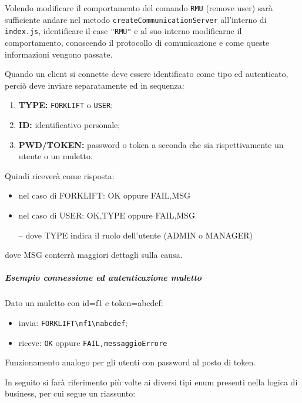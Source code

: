     Volendo modificare il comportamento del comando \texttt{RMU} (remove user) sarà sufficiente andare nel metodo \texttt{createCommunicationServer} all'interno di \texttt{index.js}, identificare il case \texttt{"RMU"} e al suo interno modificarne il comportamento, conoscendo il protocollo di comunicazione e come queste informazioni vengono passate.

    Quando un client si connette deve essere identificato come tipo ed autenticato, perciò deve inviare separatamente ed in sequenza:
    \begin{enumerate}
        \item \textbf{TYPE: }\texttt{FORKLIFT} o \texttt{USER};
        \item \textbf{ID: } identificativo personale;
        \item \textbf{PWD/TOKEN: } password o token a seconda che sia rispettivamente un utente o un muletto.
    \end{enumerate}
    Quindi riceverà come risposta:
    \begin{itemize}

        \item nel caso di FORKLIFT: OK oppure FAIL,MSG

        \item nel caso di USER: OK,TYPE oppure FAIL,MSG

        \subitem -- dove TYPE indica il ruolo dell’utente (ADMIN o MANAGER)
    \end{itemize}
    dove MSG conterrà maggiori dettagli sulla causa.

    \subparagraph{Esempio connessione ed autenticazione muletto}
        Dato un muletto con id=f1 e token=abcdef:
        \begin{itemize}
            \item invia: \texttt{FORKLIFT\textbackslash nf1\textbackslash nabcdef};

            \item riceve: \texttt{OK} oppure \texttt{FAIL,messaggioErrore}
        \end{itemize}


        Funzionamento analogo per gli utenti con password al posto di token.

\clearpage
{}
    In seguito si farà riferimento più volte ai diversi tipi enum presenti nella logica di business, per cui segue un riassunto:


